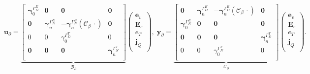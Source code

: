 \begin{equation*}
\bm{u}_\partial = 
\underbrace{\begin{bmatrix}
	\bm{\gamma}_{0}^{\Gamma_D^E} & \bm{0} & \bm{0} & \bm{0} \\
	\bm{0} & \bm{\gamma}_n^{\Gamma_N^E} & - \bm{\gamma}_n^{\Gamma_N^E}(\bm{\mathcal{C}}_\beta\, \cdot )  & \bm{0}  \\ 
	{0} & {0} & {\gamma}_{0}^{\Gamma_D^T} & {0} \\
	\bm{0} & \bm{0} & \bm{0} & \bm{\gamma}_{n}^{\Gamma_N^T} \\
	\end{bmatrix}}_{\mathcal{B}_\partial}
\begin{pmatrix}
\bm{e}_v \\
\bm{E}_\varepsilon \\
{e}_T \\
\bm{j}_Q \\
\end{pmatrix}, \; 
\bm{y}_\partial = 
\underbrace{\begin{bmatrix}
	\bm{0} & \bm{\gamma}_n^{\Gamma_D^E} & - \bm{\gamma}_n^{\Gamma_D^E}(\bm{\mathcal{C}}_\beta\, \cdot )  & \bm{0}  \\ 
	\bm{\gamma}_{0}^{\Gamma_N^E} & \bm{0} & \bm{0} & \bm{0} \\
	\bm{0} & \bm{0} & \bm{0} & \bm{\gamma}_{n}^{\Gamma_D^T} \\
	{0} & {0} & {\gamma}_{0}^{\Gamma_N^T} & {0} \\
	\end{bmatrix}}_{\mathcal{C}_\partial}
\begin{pmatrix}
\bm{e}_v \\
\bm{E}_\varepsilon \\
{e}_T \\
\bm{j}_Q \\
\end{pmatrix}.
\end{equation*} 


